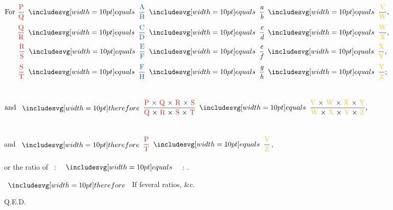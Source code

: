 \documentclass[12pt,preview]{standalone}
\begin{document}
\begin{minipage}{\textwidth}
    \begin{center}
        $\begin{aligned} \text{For } \dfrac{\text{\redP}}{\text{\redQ}} \bequals \dfrac{\text{\blueA}}{\text{\blueB}} & \bequals \dfrac{\textit{a}}{\textit{b}}                                                                                    \bequals \dfrac{\text{\yellowV}}{\text{\yellowW}}, \\[0.5ex]
                \dfrac{\text{\redQ}}{\text{\redR}} \bequals \dfrac{\text{\blueC}}{\text{\blueD}}             & \bequals \dfrac{\textit{c}}{\textit{d}}               \bequals \dfrac{\text{\yellowW}}{\text{\yellowX}},                                                                      \\[0.5ex]
                \dfrac{\text{\redR}}{\text{\redS}} \bequals \dfrac{\text{\blueE}}{\text{\blueF}}             & \bequals \dfrac{\textit{e}}{\textit{f}}              \bequals \dfrac{\text{\yellowX}}{\text{\yellowY}},                                                                       \\[0.5ex]
                \dfrac{\text{\redS}}{\text{\redT}} \bequals \dfrac{\text{\blueF}}{\text{\blueH}}             & \bequals \dfrac{\textit{g}}{\textit{h}}              \bequals \dfrac{\text{\yellowY}}{\text{\yellowZ}};                                                                       \\[0.5ex]
                \hfill\end{aligned}$\\                                                                                                            \end{center}
\end{minipage}

\newpage

\begin{minipage}{\textwidth}
    \begin{center}
        $\begin{aligned}
                \text{and }\btherefore \dfrac{\text{\redP\ × \redQ\ × \redR\ × \redS}}{\text{\redQ\ × \redR\ × \redS\ × \redT}} & \bequals \dfrac{\text{\yellowV\ × \yellowW\ × \yellowX\ × \yellowY}}{\text{\yellowW\ × \yellowX\ × \yellowY\ × \yellowZ}},\end{aligned}$\\
        \hfill\\
        \hfill\\
        and $\btherefore \dfrac{\text{\redP}}{\text{\redT}} \bequals \dfrac{\text{\yellowV}}{\text{\yellowZ}}$,\\
        \hfill\\
        or the ratio of \redP\ : \redT\ $\bequals$ \yellowV\ : \yellowZ.
    \end{center}

    \hfill

    $\btherefore$ If ſeveral ratios, \&c.

    \hfill Q.E.D.
\end{minipage}
\end{document}
